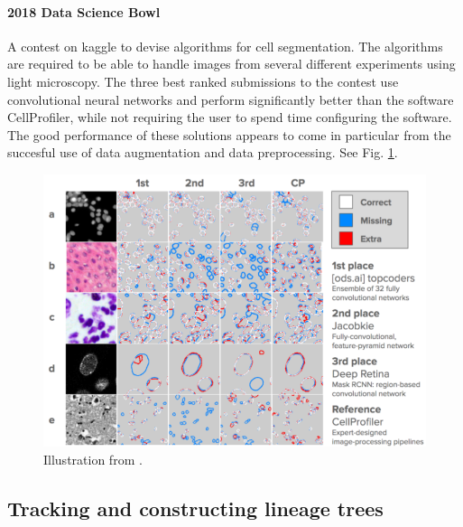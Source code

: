 \documentclass[11pt]{article} %
\begin{document}
       \paragraph{2018 Data Science Bowl \cite{marks:bowl}}
A contest on kaggle to devise algorithms for cell segmentation. The algorithms are required to be able to handle images from several different experiments using light microscopy. The three best ranked submissions to the contest use convolutional neural networks and perform significantly better than the software CellProfiler, while not requiring the user to spend time configuring the software. The good performance of these solutions appears to come in particular from the succesful use of data augmentation and data preprocessing. See Fig. \ref{fig:bowl}.
\begin{figure}[h!]
  \centering
  \includegraphics[width= \linewidth ]{bowl.png}
  \caption{Illustration from \cite{marks:bowl}.}
  \label{fig:bowl}
\end{figure}



  \subsection{Tracking and constructing lineage trees}
\end{document}
